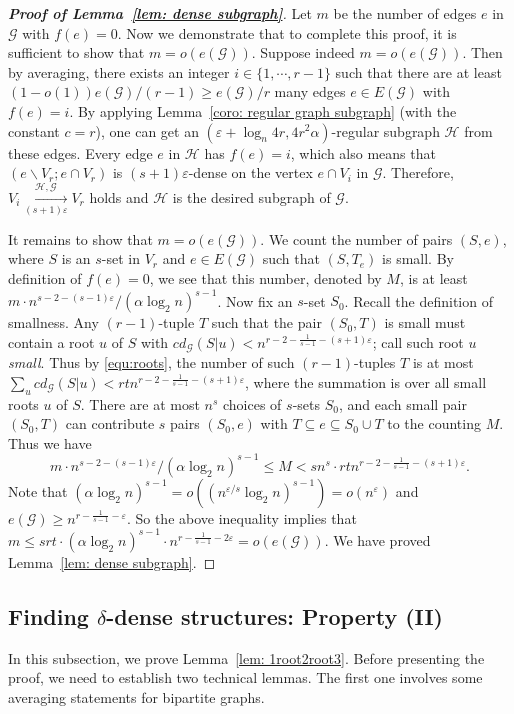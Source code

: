 \documentclass[11pt]{article}
\begin{document}
\begin{proof}[\bf Proof of Lemma~\ref{lem: dense subgraph}]
Let $m$ be the number of edges $e$ in $\mathcal G$ with $f(e)=0$.
Now we demonstrate that to complete this proof, it is sufficient to show that $m=o(e(\mathcal G))$.
Suppose indeed $m=o(e(\mathcal G))$.
Then by averaging, there exists an integer $i\in \{1,\cdots, r-1\}$ such that there are at least $(1-o(1))e(\mathcal G)/(r-1)\ge e(\mathcal G)/r $ many edges $e\in E(\mathcal G)$ with $f(e)=i$.
By applying Lemma~\ref{coro: regular graph subgraph} (with the constant $c=r$),
one can get an $(\varepsilon+\log_n 4r,4r^2\alpha)$-regular subgraph $\mathcal H$ from these edges.
Every edge $e$ in $\mathcal H$ has $f(e)=i$, which also means that $(e\backslash V_r; e\cap V_r) $ is $(s+1)\varepsilon$-dense on the vertex $e\cap  V_i$ in $\mathcal G$. Therefore, $V_i \xrightarrow[(s+1)\varepsilon]{\mathcal{H},\mathcal{G}} V_r$ holds
and $\mathcal H$ is the desired subgraph of $\mathcal G$.


It remains to show that $m=o(e(\mathcal G))$.
We count the number of pairs $(S, e)$, where $S$ is an $s$-set in $V_r$ and $e\in E(\mathcal G)$ such that $(S,T_e)$ is small.
By definition of $f(e)=0$, we see that this number, denoted by $M$, is at least $m\cdot n^{s-2- (s-1)\varepsilon}/(\alpha\log_2 n)^ { s-1}$.
Now fix an $s$-set $S_0$.
Recall the definition of smallness.
Any $(r-1)$-tuple $T$ such that the pair $(S_0,T)$ is small must contain a root $u$ of $S$ with
$cd_{\mathcal G}(S|u)< n^{r-2-\frac{1}{s-1}- (s+1)\varepsilon}$; call such root $u$ {\it small}.
Thus by \eqref{equ:roots}, the number of such $(r-1)$-tuples $T$ is at most
$\sum_{u} cd_{\mathcal G}(S|u)< rtn^{r-2-\frac{1}{s-1}- (s+1)\varepsilon}$,
where the summation is over all small roots $u$ of $S$.
There are at most $n^s$ choices of $s$-sets $S_0$,
and each small pair $(S_0,T )$ can contribute $s$ pairs $(S_0,e)$ with $T\subseteq e\subseteq S_0\cup T$ to the counting $M$.
Thus we have
$$m\cdot n^{s-2- (s-1)\varepsilon}/(\alpha\log_2 n)^ { s-1}\leq M < sn^s\cdot rt   n^{r-2-\frac{1}{s-1}- (s+1)\varepsilon}.$$
Note that $(\alpha\log_2 n)^{s-1}= o\left( (n^{\varepsilon/s} \log_2 n) ^{s-1}\right)=o\left(n^{\varepsilon }  \right)$  and $e(\mathcal G)\ge n^{r-\frac{1}{s-1}- \varepsilon}$.
So the above inequality implies that $m\le srt\cdot (\alpha\log_2 n)^ { s-1}\cdot n^{r -\frac{1}{s-1}- 2\varepsilon}= o(e(\mathcal G))$.
We have proved Lemma~\ref{lem: dense subgraph}.
\end{proof}


\subsection{Finding $\delta$-dense structures: Property (II)}
In this subsection, we prove Lemma~\ref{lem: 1root2root3}.
Before presenting the proof, we need to establish two technical lemmas.
The first one involves some averaging statements for bipartite graphs.
\end{document}
